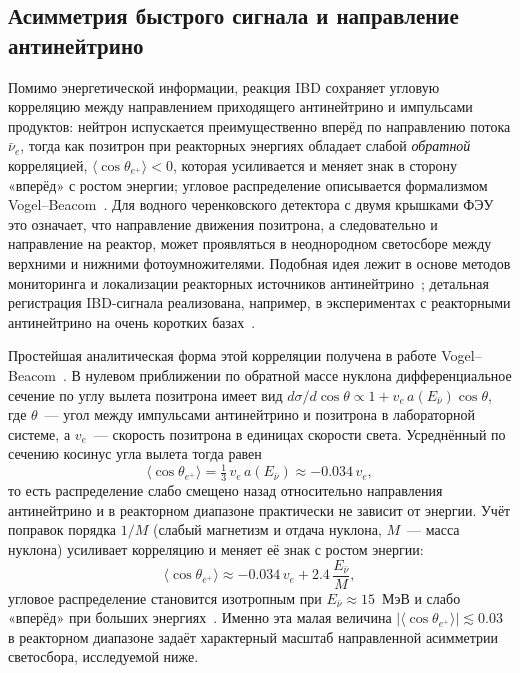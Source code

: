 \documentclass[a4paper,12pt]{extarticle}
\begin{document}
\subsection{Асимметрия быстрого сигнала и направление антинейтрино}
\label{sec:asymmetry}

Помимо энергетической информации, реакция IBD сохраняет угловую корреляцию между направлением приходящего антинейтрино и импульсами продуктов: нейтрон испускается преимущественно вперёд по направлению потока $\bar{\nu}_e$, тогда как позитрон при реакторных энергиях обладает слабой \emph{обратной} корреляцией, $\langle\cos\theta_{e^+}\rangle<0$, которая усиливается и меняет знак в сторону «вперёд» с ростом энергии; угловое распределение описывается формализмом Vogel--Beacom~\cite{vogel1999}. Для водного черенковского детектора с двумя крышками ФЭУ это означает, что направление движения позитрона, а следовательно и направление на реактор, может проявляться в неоднородном светосборе между верхними и нижними фотоумножителями. Подобная идея лежит в основе методов мониторинга и локализации реакторных источников антинейтрино~\cite{bernstein2020}; детальная регистрация IBD-сигнала реализована, например, в экспериментах с реакторными антинейтрино на очень коротких базах~\cite{ashenfelter2018}.

Простейшая аналитическая форма этой корреляции получена в работе Vogel--Beacom~\cite{vogel1999}. В нулевом приближении по обратной массе нуклона дифференциальное сечение по углу вылета позитрона имеет вид $d\sigma/d\cos\theta\propto 1+v_e\,a(E_{\bar{\nu}})\cos\theta$, где $\theta$~--- угол между импульсами антинейтрино и позитрона в лабораторной системе, а $v_e$~--- скорость позитрона в единицах скорости света. Усреднённый по сечению косинус угла вылета тогда равен
\begin{equation}
    \langle\cos\theta_{e^+}\rangle = \tfrac{1}{3}\,v_e\,a(E_{\bar{\nu}}) \approx -0.034\,v_e,
    \label{eq:vogel_costheta}
\end{equation}
то есть распределение слабо смещено назад относительно направления антинейтрино и в реакторном диапазоне практически не зависит от энергии. Учёт поправок порядка $1/M$ (слабый магнетизм и отдача нуклона, $M$~--- масса нуклона) усиливает корреляцию и меняет её знак с ростом энергии:
\begin{equation}
    \langle\cos\theta_{e^+}\rangle \approx -0.034\,v_e + 2.4\,\frac{E_{\bar{\nu}}}{M},
    \label{eq:vogel_costheta_1M}
\end{equation}
угловое распределение становится изотропным при $E_{\bar{\nu}}\approx 15$~МэВ и слабо «вперёд» при больших энергиях~\cite{vogel1999}. Именно эта малая величина $|\langle\cos\theta_{e^+}\rangle|\lesssim 0.03$ в реакторном диапазоне задаёт характерный масштаб направленной асимметрии светосбора, исследуемой ниже.
\end{document}
